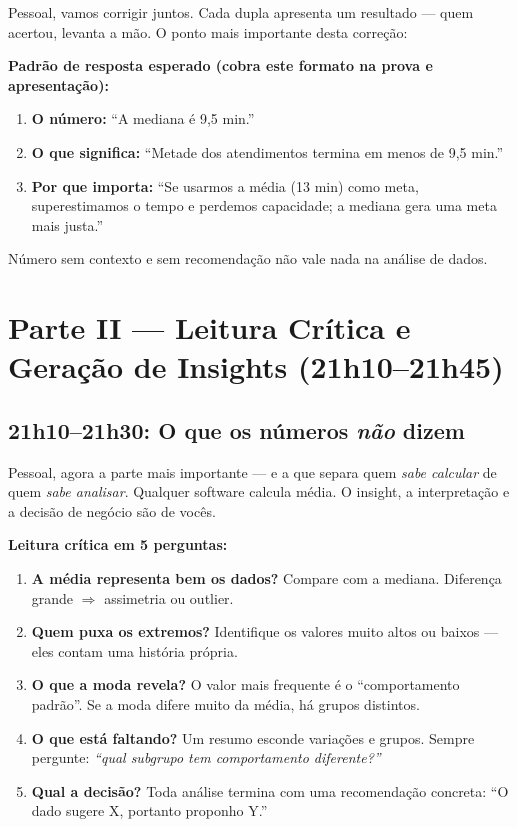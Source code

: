 Pessoal, vamos corrigir juntos. Cada dupla apresenta um resultado — quem
acertou, levanta a mão. O ponto mais importante desta correção:

\begin{SolvedBox}
\textbf{Padrão de resposta esperado (cobra este formato na prova e apresentação):}
\begin{enumerate}
  \item \textbf{O número:} ``A mediana é 9,5 min.''
  \item \textbf{O que significa:} ``Metade dos atendimentos termina em menos de 9,5 min.''
  \item \textbf{Por que importa:} ``Se usarmos a média (13 min) como meta, superestimamos
  o tempo e perdemos capacidade; a mediana gera uma meta mais justa.''
\end{enumerate}
Número sem contexto e sem recomendação não vale nada na análise de dados.
\end{SolvedBox}

\section{Parte II — Leitura Crítica e Geração de Insights (21h10–21h45)}

\subsection{21h10–21h30: O que os números \emph{não} dizem}

Pessoal, agora a parte mais importante — e a que separa quem \emph{sabe
calcular} de quem \emph{sabe analisar}. Qualquer software calcula média. O
insight, a interpretação e a decisão de negócio são de vocês.

\begin{SolvedBox}
\textbf{Leitura crítica em 5 perguntas:}
\begin{enumerate}
  \item \textbf{A média representa bem os dados?} Compare com a mediana.
  Diferença grande $\Rightarrow$ assimetria ou outlier.
  \item \textbf{Quem puxa os extremos?} Identifique os valores muito altos ou
  baixos — eles contam uma história própria.
  \item \textbf{O que a moda revela?} O valor mais frequente é o
  ``comportamento padrão''. Se a moda difere muito da média, há grupos distintos.
  \item \textbf{O que está faltando?} Um resumo esconde variações e grupos.
  Sempre pergunte: \emph{``qual subgrupo tem comportamento diferente?''}
  \item \textbf{Qual a decisão?} Toda análise termina com uma recomendação
  concreta: ``O dado sugere X, portanto proponho Y.''
\end{enumerate}
\end{SolvedBox}

